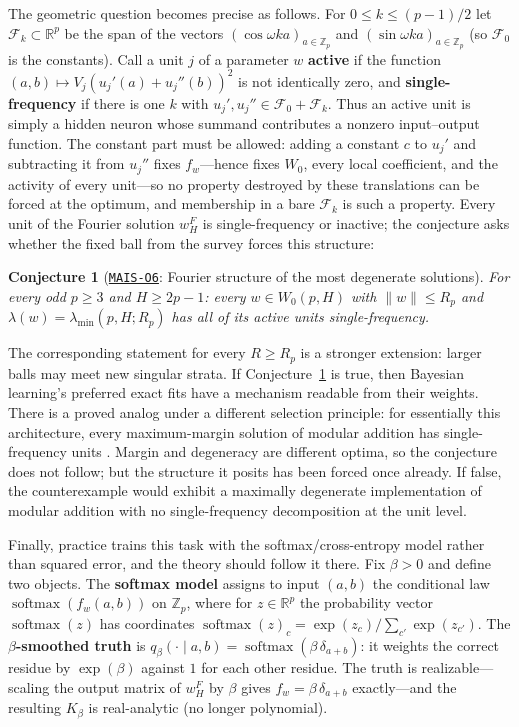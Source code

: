 \documentclass[11pt]{amsart}
\newcommand{\Oid}[1]{\href{https://github.com/lionellevine/MAIS/blob/main/open-problems/MAIS-O#1.md}{\texttt{MAIS-O#1}}}
\theoremstyle{plain}
\newtheorem{conjecture}[theorem]{Conjecture}
\theoremstyle{definition}
\newcommand{\R}{\mathbb{R}}
\newcommand{\Z}{\mathbb{Z}}
\DeclareMathOperator{\softmax}{softmax}
\begin{document}
The geometric question becomes precise as follows. For $0 \le k \le (p-1)/2$ let $\mathcal F_k \subset \R^p$ be the span of the vectors $(\cos \omega k a)_{a \in \Z_p}$ and $(\sin \omega k a)_{a \in \Z_p}$ (so $\mathcal F_0$ is the constants). Call a unit $j$ of a parameter $w$ \textbf{active} if the function $(a,b) \mapsto V_j (u_j'(a) + u_j''(b))^2$ is not identically zero, and \textbf{single-frequency} if there is one $k$ with $u_j', u_j'' \in \mathcal F_0 + \mathcal F_k$. Thus an active unit is simply a hidden neuron whose summand contributes a nonzero input--output function. The constant part must be allowed: adding a constant $c$ to $u_j'$ and subtracting it from $u_j''$ fixes $f_w$---hence fixes $W_0$, every local coefficient, and the activity of every unit---so no property destroyed by these translations can be forced at the optimum, and membership in a bare $\mathcal F_k$ is such a property. Every unit of the Fourier solution $w^F_H$ is single-frequency or inactive; the conjecture asks whether the fixed ball from the survey forces this structure:

\begin{conjecture}[\Oid{6}: Fourier structure of the most degenerate solutions]\label{conj:fourier}
For every odd $p \ge 3$ and $H \ge 2p - 1$\textup{:} every $w \in W_0(p, H)$ with $\|w\| \le R_p$ and $\lambda(w) = \lambda_{\min}(p, H; R_p)$ has all of its active units single-frequency.
\end{conjecture}

The corresponding statement for every $R\ge R_p$ is a stronger extension: larger balls may meet new singular strata. If Conjecture~\ref{conj:fourier} is true, then Bayesian learning's preferred exact fits have a mechanism readable from their weights. There is a proved analog under a different selection principle: for essentially this architecture, every maximum-margin solution of modular addition has single-frequency units \cite{morwani2024}. Margin and degeneracy are different optima, so the conjecture does not follow; but the structure it posits has been forced once already. If false, the counterexample would exhibit a maximally degenerate implementation of modular addition with no single-frequency decomposition at the unit level.

Finally, practice trains this task with the softmax/cross-entropy model rather than squared error, and the theory should follow it there. Fix $\beta > 0$ and define two objects. The \textbf{softmax model} assigns to input $(a,b)$ the conditional law $\softmax(f_w(a,b))$ on $\Z_p$, where for $z \in \R^p$ the probability vector $\softmax(z)$ has coordinates $\softmax(z)_c = \exp(z_c)/\sum_{c'} \exp(z_{c'})$. The \textbf{$\beta$-smoothed truth} is $q_\beta(\cdot \mid a,b) = \softmax(\beta\, \delta_{a+b})$: it weights the correct residue by $\exp(\beta)$ against $1$ for each other residue. The truth is realizable---scaling the output matrix of $w^F_H$ by $\beta$ gives $f_w = \beta\,\delta_{a+b}$ exactly---and the resulting $K_\beta$ is real-analytic (no longer polynomial).
\end{document}
